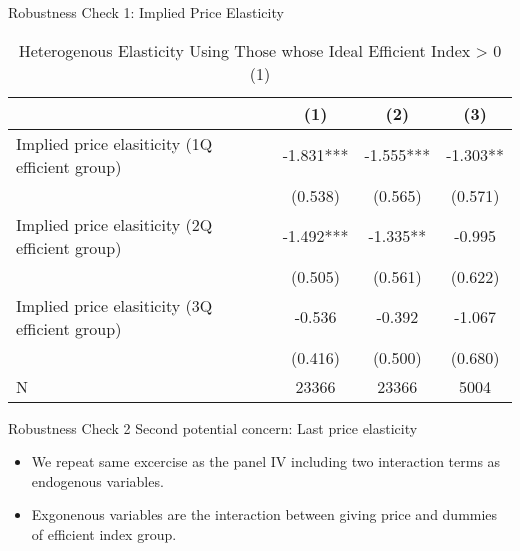 \documentclass[
  ignorenonframetext,
]{beamer}
\providecommand{\tightlist}{%
  \setlength{\itemsep}{0pt}\setlength{\parskip}{0pt}}
\begin{document}
\begin{frame}{Robustness Check 1: Implied Price Elasticity}
\protect\hypertarget{robustness-check-1-implied-price-elasticity}{}
\begin{table}

\caption{\label{tab:kableSubsetHeteroElasticitySlide2}Heterogenous Elasticity Using Those whose Ideal Efficient Index > 0 (1)}
\centering
\fontsize{8}{10}\selectfont
\begin{tabular}[t]{lccc}
\toprule
 & (1) & (2) & (3)\\
\midrule
Implied price elasiticity (1Q efficient group) & -1.831*** & -1.555*** & -1.303**\\
 & (0.538) & (0.565) & (0.571)\\
Implied price elasiticity (2Q efficient group) & -1.492*** & -1.335** & -0.995\\
 & (0.505) & (0.561) & (0.622)\\
Implied price elasiticity (3Q efficient group) & -0.536 & -0.392 & -1.067\\
 & (0.416) & (0.500) & (0.680)\\
N & 23366 & 23366 & 5004\\
\bottomrule
\end{tabular}
\end{table}
\end{frame}

\begin{frame}{Robustness Check 2}
\protect\hypertarget{robustness-check-2}{}
Second potential concern: Last price elasticity

\begin{itemize}
\tightlist
\item
  We repeat same excercise as the panel IV including two interaction terms as endogenous variables.
\item
  Exgonenous variables are the interaction between giving price and dummies of efficient index group.
\end{itemize}
\end{frame}
\end{document}
